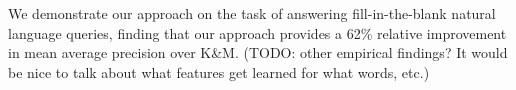 \documentclass[11pt]{article}
\begin{document}
We demonstrate our approach on the task of answering fill-in-the-blank
natural language queries, finding that our approach provides a 62\%
relative improvement in mean average precision over K\&M. (TODO: other
empirical findings? It would be nice to talk about what features get
learned for what words, etc.)


\end{document}
